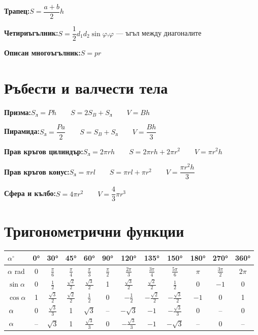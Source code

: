 \documentclass[12pt,a4paper]{article}
\let\tg\relax
\let\cotg\relax
\newcommand{\tg}{\operatorname{tg}}%
\newcommand{\cotg}{\operatorname{cotg}}%
\begin{document}
\textbf{Трапец:}\quad $S = \dfrac{a+b}{2}h$

\textbf{Четириъгълник:}\quad $S = \dfrac{1}{2}d_1 d_2\sin\varphi$,\quad $\varphi$ --- ъгъл между диагоналите

\textbf{Описан многоъгълник:}\quad $S = pr$

\section{Ръбести и валчести тела}

\textbf{Призма:}\quad $S_{\text{л}} = Ph \qquad S = 2S_B + S_{\text{л}} \qquad V = Bh$

\textbf{Пирамида:}\quad $S_{\text{л}} = \dfrac{Pa}{2} \qquad S = S_B + S_{\text{л}} \qquad V = \dfrac{Bh}{3}$

\textbf{Прав кръгов цилиндър:}\quad $S_{\text{л}} = 2\pi r h \qquad S = 2\pi rh + 2\pi r^2 \qquad V = \pi r^2 h$

\textbf{Прав кръгов конус:}\quad $S_{\text{л}} = \pi r l \qquad S = \pi rl + \pi r^2 \qquad V = \dfrac{\pi r^2 h}{3}$

\textbf{Сфера и кълбо:}\quad $S = 4\pi r^2 \qquad V = \dfrac{4}{3}\pi r^3$

\newpage
\section{Тригонометрични функции}

\begin{center}
\renewcommand{\arraystretch}{1.6}
\begin{tabular}{l*{11}{c}}
\toprule
$\alpha^\circ$ & 0° & 30° & 45° & 60° & 90° & 120° & 135° & 150° & 180° & 270° & 360° \\
\midrule
$\alpha$ rad & 0 & $\frac{\pi}{6}$ & $\frac{\pi}{4}$ & $\frac{\pi}{3}$ & $\frac{\pi}{2}$ & $\frac{2\pi}{3}$ & $\frac{3\pi}{4}$ & $\frac{5\pi}{6}$ & $\pi$ & $\frac{3\pi}{2}$ & $2\pi$ \\
$\sin\alpha$ & 0 & $\frac{1}{2}$ & $\frac{\sqrt{2}}{2}$ & $\frac{\sqrt{3}}{2}$ & 1 & $\frac{\sqrt{3}}{2}$ & $\frac{\sqrt{2}}{2}$ & $\frac{1}{2}$ & 0 & $-1$ & 0 \\
$\cos\alpha$ & 1 & $\frac{\sqrt{3}}{2}$ & $\frac{\sqrt{2}}{2}$ & $\frac{1}{2}$ & 0 & $-\frac{1}{2}$ & $-\frac{\sqrt{2}}{2}$ & $-\frac{\sqrt{3}}{2}$ & $-1$ & 0 & 1 \\
$\tg\,\alpha$ & 0 & $\frac{\sqrt{3}}{3}$ & 1 & $\sqrt{3}$ & -- & $-\sqrt{3}$ & $-1$ & $-\frac{\sqrt{3}}{3}$ & 0 & -- & 0 \\
$\cotg\,\alpha$ & -- & $\sqrt{3}$ & 1 & $\frac{\sqrt{3}}{3}$ & 0 & $-\frac{\sqrt{3}}{3}$ & $-1$ & $-\sqrt{3}$ & -- & 0 & -- \\
\bottomrule
\end{tabular}
\end{center}
\end{document}
